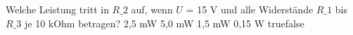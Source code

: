    {Welche Leistung tritt in $R\_2$ auf, wenn $U$ = 15 V und alle Widerstände $R\_1$ bis $R\_3$ je 10 kOhm betragen? }
    {2,5 mW}
    {5,0 mW}
    {1,5 mW}
    {0,15 W}
    {true}{false}
